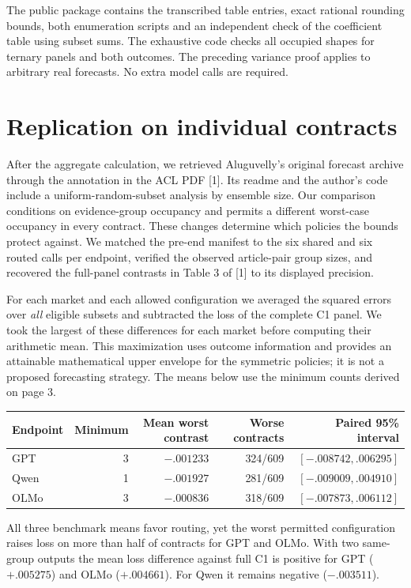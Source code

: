 \documentclass[11pt]{article}
\begin{document}
The public package contains the transcribed table entries, exact rational rounding bounds, both enumeration scripts and an independent check of the coefficient table using subset sums. The exhaustive code checks all occupied shapes for ternary panels and both outcomes. The preceding variance proof applies to arbitrary real forecasts. No extra model calls are required.

\newpage
\section{Replication on individual contracts}
After the aggregate calculation, we retrieved Aluguvelly's original forecast archive through the annotation in the ACL PDF [1]. Its readme and the author's code include a uniform-random-subset analysis by ensemble size. Our comparison conditions on evidence-group occupancy and permits a different worst-case occupancy in every contract. These changes determine which policies the bounds protect against. We matched the pre-end manifest to the six shared and six routed calls per endpoint, verified the observed article-pair group sizes, and recovered the full-panel contrasts in Table 3 of [1] to its displayed precision.

For each market and each allowed configuration we averaged the squared errors over \emph{all} eligible subsets and subtracted the loss of the complete C1 panel. We took the largest of these differences for each market before computing their arithmetic mean. This maximization uses outcome information and provides an attainable mathematical upper envelope for the symmetric policies; it is not a proposed forecasting strategy. The means below use the minimum counts derived on page 3.

\begin{center}
\begin{tabular}{lrrrr}
\toprule
Endpoint & Minimum & Mean worst contrast & Worse contracts & Paired 95\% interval\\\midrule
GPT &3&$-.001233$&324/609&$[-.008742,.006295]$\\
Qwen &1&$-.001927$&281/609&$[-.009009,.004910]$\\
OLMo &3&$-.000836$&318/609&$[-.007873,.006112]$\\
\bottomrule
\end{tabular}
\end{center}
All three benchmark means favor routing, yet the worst permitted configuration raises loss on more than half of contracts for GPT and OLMo. With two same-group outputs the mean loss difference against full C1 is positive for GPT ($+.005275$) and OLMo ($+.004661$). For Qwen it remains negative ($-.003511$).
\end{document}
